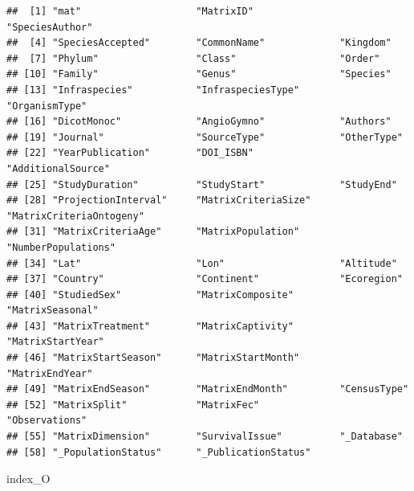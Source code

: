 \documentclass[
]{book}
\newenvironment{Shaded}{\begin{snugshade}}{\end{snugshade}}
\newcommand{\NormalTok}[1]{#1}
\theoremstyle{definition}
\theoremstyle{definition}
\theoremstyle{definition}
\theoremstyle{definition}
\theoremstyle{remark}
\begin{document}
\begin{verbatim}
##  [1] "mat"                    "MatrixID"               "SpeciesAuthor"         
##  [4] "SpeciesAccepted"        "CommonName"             "Kingdom"               
##  [7] "Phylum"                 "Class"                  "Order"                 
## [10] "Family"                 "Genus"                  "Species"               
## [13] "Infraspecies"           "InfraspeciesType"       "OrganismType"          
## [16] "DicotMonoc"             "AngioGymno"             "Authors"               
## [19] "Journal"                "SourceType"             "OtherType"             
## [22] "YearPublication"        "DOI_ISBN"               "AdditionalSource"      
## [25] "StudyDuration"          "StudyStart"             "StudyEnd"              
## [28] "ProjectionInterval"     "MatrixCriteriaSize"     "MatrixCriteriaOntogeny"
## [31] "MatrixCriteriaAge"      "MatrixPopulation"       "NumberPopulations"     
## [34] "Lat"                    "Lon"                    "Altitude"              
## [37] "Country"                "Continent"              "Ecoregion"             
## [40] "StudiedSex"             "MatrixComposite"        "MatrixSeasonal"        
## [43] "MatrixTreatment"        "MatrixCaptivity"        "MatrixStartYear"       
## [46] "MatrixStartSeason"      "MatrixStartMonth"       "MatrixEndYear"         
## [49] "MatrixEndSeason"        "MatrixEndMonth"         "CensusType"            
## [52] "MatrixSplit"            "MatrixFec"              "Observations"          
## [55] "MatrixDimension"        "SurvivalIssue"          "_Database"             
## [58] "_PopulationStatus"      "_PublicationStatus"
\end{verbatim}

\begin{Shaded}
\begin{Highlighting}[]
\NormalTok{index\_O}
\end{Highlighting}
\end{Shaded}
\end{document}
